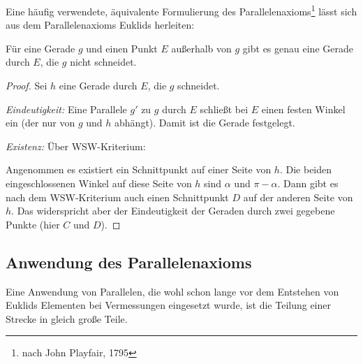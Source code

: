 \bigskip

Eine häufig verwendete, äquivalente Formulierung des Parallelenaxioms\footnote{nach John Playfair,
1795} lässt sich aus dem Parallelenaxioms Euklids herleiten:

\begin{thm}
    Für eine Gerade $g$ und einen Punkt $E$ außerhalb von $g$ gibt es genau eine Gerade durch $E$,
    die $g$ nicht schneidet.
\end{thm}


\begin{proof}
Sei $h$ eine Gerade durch $E$, die $g$ schneidet. %

{\em Eindeutigkeit:} Eine Parallele $g'$ zu $g$ durch $E$ schließt bei $E$ einen festen Winkel ein
(der nur von $g$ und $h$ abhängt). Damit ist die Gerade festgelegt.

{\em Existenz:} Über WSW-Kriterium:

Angenommen es existiert ein Schnittpunkt auf einer Seite von $h$. Die beiden eingeschlossenen
Winkel auf diese Seite von $h$ sind $\alpha$ und $\pi-\alpha$. Dann gibt es nach dem WSW-Kriterium
auch einen Schnittpunkt $D$ auf der anderen Seite von $h$. Das widerspricht aber der Eindeutigkeit
der Geraden durch zwei gegebene Punkte (hier $C$ und $D$).
\end{proof}

\subsection*{Anwendung des Parallelenaxioms}

Eine Anwendung von Parallelen, die wohl schon lange vor dem Entstehen von Euklids Elementen bei
Vermessungen eingesetzt wurde, ist die Teilung einer Strecke in gleich große Teile.

